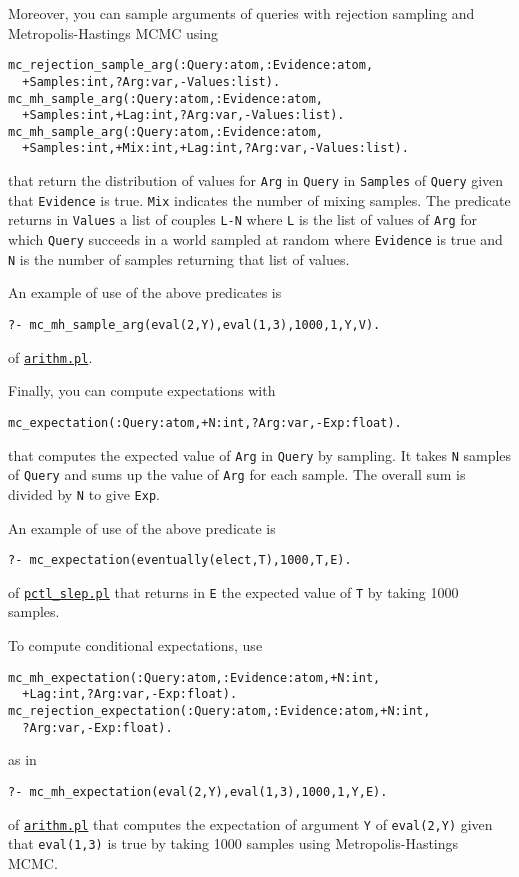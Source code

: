 Moreover, you can sample arguments of queries with rejection sampling and Metropolis-Hastings MCMC using
\begin{verbatim}
mc_rejection_sample_arg(:Query:atom,:Evidence:atom,
  +Samples:int,?Arg:var,-Values:list).
mc_mh_sample_arg(:Query:atom,:Evidence:atom,
  +Samples:int,+Lag:int,?Arg:var,-Values:list).
mc_mh_sample_arg(:Query:atom,:Evidence:atom,
  +Samples:int,+Mix:int,+Lag:int,?Arg:var,-Values:list).
\end{verbatim}
that return the distribution of values for \verb|Arg| in \verb|Query| in \verb|Samples| of
\verb|Query| given that \verb|Evidence| is true. \verb|Mix| indicates the
number of mixing samples.
The predicate returns in \verb|Values| a list of couples \verb|L-N| where
\verb|L| is the list of values of \verb|Arg| for which \verb|Query|
succeeds in a world sampled at random where \verb|Evidence| is true and \verb|N|
is the number of samples returning that list of values.

An example of use of the above predicates is
\begin{verbatim}
?- mc_mh_sample_arg(eval(2,Y),eval(1,3),1000,1,Y,V).
\end{verbatim}
of \href{http://cplint.ml.unife.it/example/inference/arithm.pl}{\texttt{arithm.pl}}.

Finally, you can compute expectations with
\begin{verbatim}
mc_expectation(:Query:atom,+N:int,?Arg:var,-Exp:float).
\end{verbatim}
that computes the expected value of \verb|Arg| in \verb|Query| by
sampling.
It takes \verb|N| samples of \verb|Query| and sums up the value of \verb|Arg| for
each sample. The overall sum is divided by \verb|N| to give \verb|Exp|.

An example of use of the above predicate is
\begin{verbatim}
?- mc_expectation(eventually(elect,T),1000,T,E).
\end{verbatim}
of \href{http://cplint.ml.unife.it/example/inference/pctl_slep.pl}{\texttt{pctl\_slep.pl}}
that returns in \verb|E| the expected value of \verb|T| by taking 1000 samples.

To compute conditional expectations, use
\begin{verbatim}
mc_mh_expectation(:Query:atom,:Evidence:atom,+N:int,
  +Lag:int,?Arg:var,-Exp:float).
mc_rejection_expectation(:Query:atom,:Evidence:atom,+N:int,
  ?Arg:var,-Exp:float).
\end{verbatim}
as in
\begin{verbatim}
?- mc_mh_expectation(eval(2,Y),eval(1,3),1000,1,Y,E).
\end{verbatim}
of \href{http://cplint.ml.unife.it/example/inference/arithm.pl}{\texttt{arithm.pl}}
that computes the expectation of argument \verb|Y| of \verb|eval(2,Y)| given that
\verb|eval(1,3)| is true by taking 1000 samples using Metropolis-Hastings MCMC.

